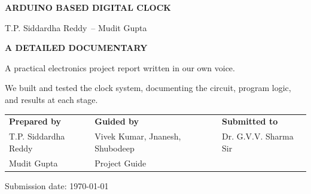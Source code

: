 \documentclass[12pt,letterpaper]{article}
\newcommand{\ProjectTitle}{Arduino Based Digital Clock}
\newcommand{\ProjectSubtitle}{
A Detailed Documentary
}
\newcommand{\TeamMemberOne}{T.P. Siddardha Reddy}
\newcommand{\TeamMemberTwo}{Mudit Gupta}
\newcommand{\GuideName}{Vivek Kumar, Jnanesh, Shubodeep}
\newcommand{\SubmittedTo}{Dr. G.V.V. Sharma Sir}
\newcommand{\SubmissionDate}{\today}
\begin{document}

\begin{center}
  \vspace*{4mm}

  {\Large\bfseries \MakeUppercase{\ProjectTitle}\par}
  \vspace{0.55em}
  {\large \TeamMemberOne\ -- \TeamMemberTwo\par}

  \vspace{28mm}

  {\large\bfseries \MakeUppercase{\ProjectSubtitle}\par}

  \vspace{8mm}

  \begin{minipage}{0.80\textwidth}
    \centering
    A practical electronics project report written in our own voice.

    \smallskip
    \small
    We built and tested the clock system,
    documenting the circuit, program logic,
    and results at each stage.
  \end{minipage}

  \vspace{12mm}

  \begin{tabularx}{0.96\textwidth}{
    @{}
    >{\raggedright\arraybackslash}X
    >{\centering\arraybackslash}X
    >{\raggedleft\arraybackslash}X
    @{}
  }
    \textbf{Prepared by}
    &
    \textbf{Guided by}
    &
    \textbf{Submitted to}
    \\[2mm]

    \TeamMemberOne
    &
    \GuideName
    &
    \SubmittedTo
    \\

    \TeamMemberTwo
    &
    Project Guide
    &
    \\
  \end{tabularx}

  \vspace{10mm}

  {\large Submission date: \SubmissionDate\par}
\end{center}

\vspace{10mm}

\end{document}
